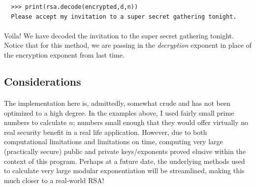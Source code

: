 \documentclass[12pt,a4paper]{article}
\begin{document}
\begin{verbatim}
  >>> print(rsa.decode(encrypted,d,n))
  Please accept my invitation to a super secret gathering tonight.
\end{verbatim}

\paragraph{}
Voila!  We have decoded the invitation to the super secret gathering tonight.
Notice that for this method, we are passing in the \textit{decryption} 
exponent in place of the encryption exponent from last time.

\subsection{Considerations}
\paragraph{}
The implementation here is, admittedly, somewhat crude and has not been 
optimized to a high degree.  In the examples above, I used fairly small prime 
numbers to calculate $n$; numbers small enough that they would offer virtually 
no real security benefit in a real life application.  However, due to both 
computational limitations and limitations on time, computing very large 
(practically secure) public and private keys/exponents proved elusive within 
the context of this program.  Perhaps at a future date, the underlying methods 
used to calculate very large modular exponentiation will be streamlined, making 
this much closer to a real-world RSA!




\end{document}
